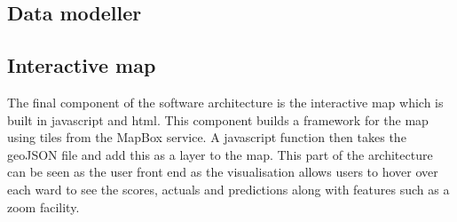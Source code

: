 
\subsection{Data modeller}



\subsection{Interactive map}
The final component of the software architecture is the interactive map which is built in javascript and html. This component builds a framework for the map using tiles from the MapBox service. A javascript function then takes the geoJSON file and add this as a layer to the map. This part of the architecture can be seen as the user front end as the visualisation allows users to hover over each ward to see the scores, actuals and predictions along with features such as a zoom facility.